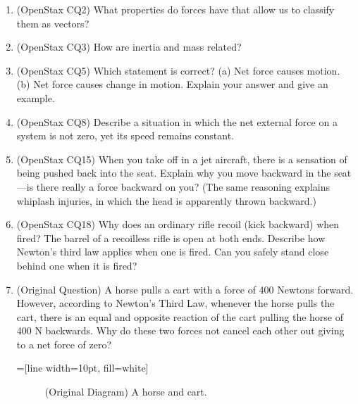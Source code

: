 \documentclass[10pt]{exam}
\begin{document}
\begin{questions}
  \begin{enumerate}[label=CQ\arabic*.]
    \item (OpenStax CQ2) What properties do forces have that allow us to classify them as vectors?
    \item (OpenStax CQ3) How are inertia and mass related?
    \item (OpenStax CQ5) Which statement is correct? (a) Net force causes motion. (b) Net force causes change in motion. Explain your answer and give an example.
    \item (OpenStax CQ8) \hfill Describe a situation in which the net external force on a system is not zero, yet its speed remains constant.
    \item (OpenStax CQ15) When you take off in a jet aircraft, there is a sensation of being pushed back into the seat. Explain why you move backward in the seat—is there really a force backward on you? (The same reasoning explains whiplash injuries, in which the head is apparently thrown backward.)
    \item (OpenStax CQ18) Why does an ordinary rifle recoil (kick backward) when fired? The barrel of a recoilless rifle is open at both ends. Describe how Newton's third law applies when one is fired. Can you safely stand close behind one when it is fired?
    \item (Original Question) \hfill A horse pulls a cart with a force of 400 Newtons forward.  However, according to Newton's Third Law, whenever the horse pulls the cart, there is an equal and opposite reaction of the cart pulling the horse of 400 N backwards.  Why do these two forces not cancel each other out giving to a net force of zero?

    =[line width=10pt, fill=white]

    \begin{figure}[ht]
      \centering
      \caption{(Original Diagram) A horse and cart.}
      \label{horse-cart}
    \end{figure}


\end{enumerate}
\end{questions}
\end{document}
